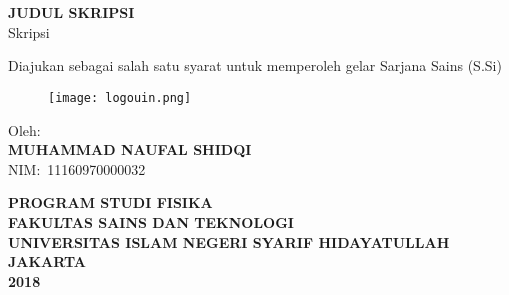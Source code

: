 \chapter*{}
\thispagestyle{empty}
\begin{center}
    {\textbf{\Large JUDUL SKRIPSI}}\\
    \vspace{2cm}
    {\large Skripsi}

    Diajukan sebagai salah satu syarat untuk memperoleh gelar Sarjana Sains (S.Si)

    \begin{figure}[H]
        \centering
        \vspace{1cm}
        \texttt{[image: logouin.png]}\label{fig:logouin}\\
        \vspace{2cm}
    \end{figure}

    Oleh:\\
    \textbf{MUHAMMAD NAUFAL SHIDQI}\\
    NIM:\ 11160970000032\\
    \vfill

    {%
    \bfseries 
        PROGRAM STUDI FISIKA\\
        FAKULTAS SAINS DAN TEKNOLOGI\\
        UNIVERSITAS ISLAM NEGERI SYARIF HIDAYATULLAH\\
        JAKARTA\\
        2018\\
    }
\end{center}
